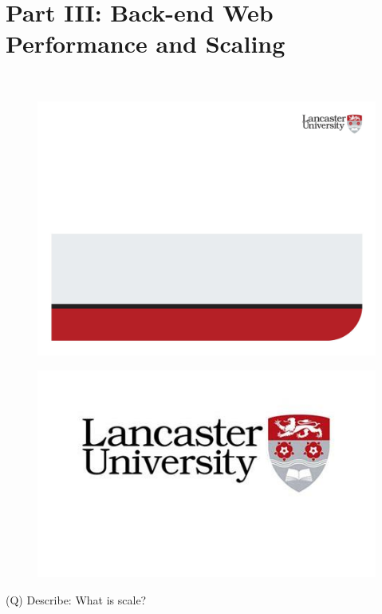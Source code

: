 \documentclass[12pt]{article}
\begin{document}
\section{Part III: Back-end Web Performance and Scaling}
\\
\begin{figure}[H]
\includegraphics[width=0.5\linewidth]{page61-image-1.png}
\end{figure}
\begin{figure}[H]
\includegraphics[width=0.5\linewidth]{page61-image-2.png}
\end{figure}
\clearpage
(Q)
Describe: What is scale?
\clearpage
\end{document}
